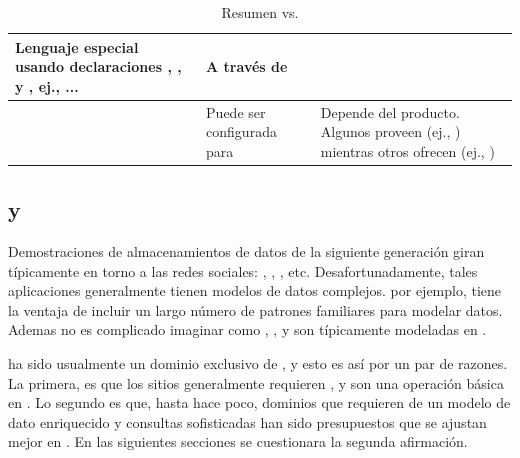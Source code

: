 \begin{table}[h!]
\begin{tabular}{ |L{0.1\paperwidth}|L{0.3\paperwidth}|L{0.3\paperwidth}|}
	Lenguaje especial usando declaraciones \selectDB, \insertDB, y \updateDB, ej., \selectDBUpper \fields \fromDBUpper \tableDB \whereDBUpper ... &	
	
	A través de \apis \objectOriented

\\ \hline

	\consistencyDB&
	
	Puede ser configurada para \strongConsistency&
	
	Depende del producto. Algunos proveen \strongConsistency (ej., \mongodbNAME) mientras otros ofrecen \eventualConsistency (ej., \cassandra)

\\ \hline
\end{tabular}
    \caption{ Resumen \nosql vs. \sql}
    \label{tab:SQL_vs_noSQL_summary}
\end{table}

\subsection{\mongodbNAME y \ecommerce \cite{online_mongodb_ecommerce}}
\label{cap:justificacion_proyecto:MongoDB_ECommerce}

Demostraciones de almacenamientos de datos de la siguiente generación giran típicamente en torno a las redes sociales: \twitter, \facebook, \foursquare, etc. Desafortunadamente, tales aplicaciones generalmente tienen modelos de datos complejos. \ecommerce por ejemplo, tiene la ventaja de incluir un largo número de patrones familiares para modelar datos. Ademas no es complicado imaginar como \itemCOM, \categoriesCommerce, \itemReviewsCommerce y \ordersCommerce son típicamente modeladas en \rdbms.

\ecommerce ha sido usualmente un dominio exclusivo de \rdbms, y esto es así por un par de razones. La primera, es que los sitios \ecommerce generalmente requieren \transactionsDB, y \transactionsDB son una operación básica en \rdbms. Lo segundo es que, hasta hace poco, dominios que requieren de un modelo de dato enriquecido y consultas sofisticadas han sido presupuestos que se ajustan mejor en \rdbms. En las siguientes secciones se cuestionara la segunda afirmación. 

